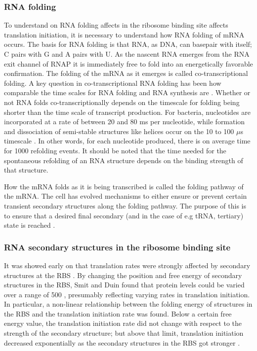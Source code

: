 \subsubsection{RNA folding} To understand on RNA folding affects in the
ribosome binding site affects translation initiation, it is necessary to
understand how RNA folding of mRNA occurs. The basis for RNA folding is that
RNA, as DNA, can basepair with itself; C pairs with G and A pairs with U. As
the nascent RNA emerges from the RNA exit channel of RNAP it is immediately
free to fold into an energetically favorable confirmation. The folding of the
mRNA as it emerges is called co-transcriptional folding. A key question in
co-transcriptional RNA folding has been how comparable the time scales for RNA
folding and RNA synthesis are \cite{de_smit_translational_2003-1}. Whether or
not RNA folds co-transcriptionally depends on the timescale for folding being
shorter than the time scale of transcript production. For bacteria, nucleotides
are incorporated at a rate of between 20 and 80 ms per nucleotide, while
formation and dissociation of semi-stable structures like helices occur on the
10 to 100 $\mu$s timescale \cite{isambert_jerky_2009}. In other words, for each
nucleotide produced, there is on average time for 1000 refolding events. It
should be noted that the time needed for the spontaneous refolding of an RNA
structure depends on the binding strength of that structure.

How the mRNA folds as it is being transcribed is called the folding pathway of
the mRNA. The cell has evolved mechanisms to either ensure or prevent certain
transient secondary structures along the folding pathway. The purpose of this
is to ensure that a desired final secondary (and in the case of e.g tRNA,
tertiary) state is reached \cite{pan_rna_2006-1}.

\subsubsection{RNA secondary structures in the ribosome binding site} It was
showed early on that translation rates were strongly affected by secondary
structures at the RBS \cite{hall_role_1982}. By changing the position and free
energy of secondary structures in the RBS, Smit and Duin found that protein
levels could be varied over a range of 500 \cite{de_smit_secondary_1990},
presumably reflecting varying rates in translation initiation. In particular, a
non-linear relationship between the folding energy of structures in the RBS and
the translation initiation rate was found. Below a certain free energy value,
the translation initiation rate did not change with respect to the strength of
the secondary structure; but above that limit, translation initiation decreased
exponentially as the secondary structures in the RBS got stronger
\cite{de_smit_secondary_1990}.

